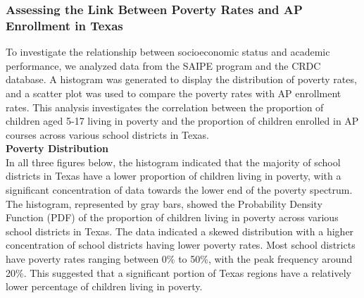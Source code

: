 \documentclass[sn-mathphys-num]{sn-jnl}%
\theoremstyle{thmstyleone}%
\theoremstyle{thmstyletwo}%
\theoremstyle{thmstylethree}%
\begin{document}
{%


\subsubsection{Assessing the Link Between Poverty Rates and AP Enrollment in Texas}
\label{sec:socioeconomic}

To investigate the relationship between socioeconomic status and academic performance, we analyzed data from the SAIPE program and the CRDC database. A histogram was generated to display the distribution of poverty rates, and a scatter plot was used to compare the poverty rates with AP enrollment rates. This analysis investigates the correlation between the proportion of children aged 5-17 living in poverty and the proportion of children enrolled in AP courses across various school districts in Texas.\\

\textbf{Poverty Distribution}\\

In all three figures below, the histogram indicated that the majority of school districts in Texas have a lower proportion of children living in poverty, with a significant concentration of data towards the lower end of the poverty spectrum.\\

The histogram, represented by gray bars, showed the Probability Density Function (PDF) of the proportion of children living in poverty across various school districts in Texas. The data indicated a skewed distribution with a higher concentration of school districts having lower poverty rates. Most school districts have poverty rates ranging between 0\% to 50\%, with the peak frequency around 20\%. This suggested that a significant portion of Texas regions have a relatively lower percentage of children living in poverty.\\

}
\end{document}
